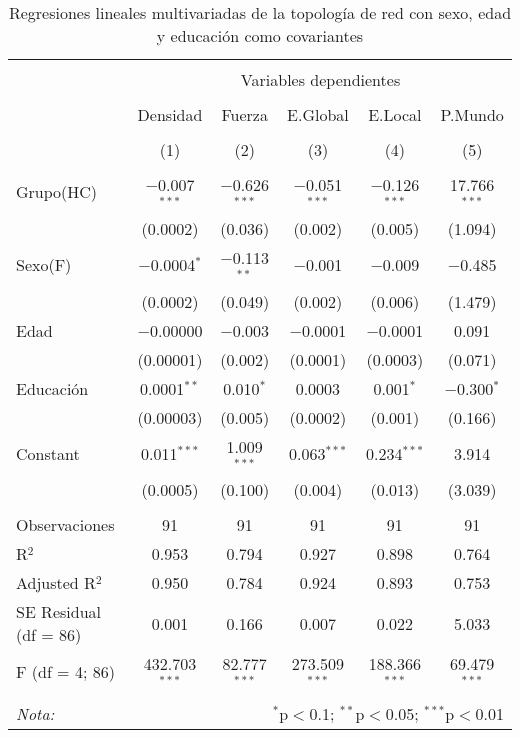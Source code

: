 \begin{table}[H] \centering
  \caption{Regresiones lineales multivariadas de la topología de red con sexo, edad y educación como covariantes}
  \label{tab:lmHC}
  \small
\begin{tabular}{@{\extracolsep{5pt}}lccccc}
\\[-1.8ex]\hline
\hline \\[-1.8ex]
 & \multicolumn{5}{c}{Variables dependientes} \\
\cline{2-6}
\\[-1.8ex] & Densidad & Fuerza & E.Global & E.Local & P.Mundo \\
\\[-1.8ex] & (1) & (2) & (3) & (4) & (5)\\
\hline \\[-1.8ex]
 Grupo(HC) & $-$0.007$^{***}$ & $-$0.626$^{***}$ & $-$0.051$^{***}$ & $-$0.126$^{***}$ & 17.766$^{***}$ \\
  & (0.0002) & (0.036) & (0.002) & (0.005) & (1.094) \\
  Sexo(F) & $-$0.0004$^{*}$ & $-$0.113$^{**}$ & $-$0.001 & $-$0.009 & $-$0.485 \\
  & (0.0002) & (0.049) & (0.002) & (0.006) & (1.479) \\
  Edad & $-$0.00000 & $-$0.003 & $-$0.0001 & $-$0.0001 & 0.091 \\
  & (0.00001) & (0.002) & (0.0001) & (0.0003) & (0.071) \\
  Educación & 0.0001$^{**}$ & 0.010$^{*}$ & 0.0003 & 0.001$^{*}$ & $-$0.300$^{*}$ \\
  & (0.00003) & (0.005) & (0.0002) & (0.001) & (0.166) \\
  Constant & 0.011$^{***}$ & 1.009$^{***}$ & 0.063$^{***}$ & 0.234$^{***}$ & 3.914 \\
  & (0.0005) & (0.100) & (0.004) & (0.013) & (3.039) \\
 \hline \\[-1.8ex]
Observaciones & 91 & 91 & 91 & 91 & 91 \\
R$^{2}$ & 0.953 & 0.794 & 0.927 & 0.898 & 0.764 \\
Adjusted R$^{2}$ & 0.950 & 0.784 & 0.924 & 0.893 & 0.753 \\
SE Residual (df = 86) & 0.001 & 0.166 & 0.007 & 0.022 & 5.033 \\
F (df = 4; 86) & 432.703$^{***}$ & 82.777$^{***}$ & 273.509$^{***}$ & 188.366$^{***}$ & 69.479$^{***}$ \\
\hline
\hline \\[-1.8ex]
\textit{Nota:}  & \multicolumn{5}{r}{$^{*}$p$<$0.1; $^{**}$p$<$0.05; $^{***}$p$<$0.01} \\
\end{tabular}
\end{table}

